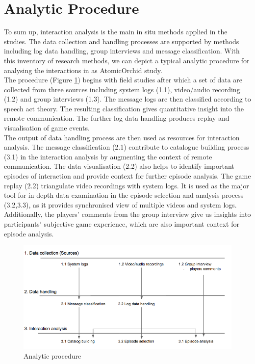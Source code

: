 \section{Analytic Procedure}
To sum up, interaction analysis is the main in situ methods applied in the studies. The data collection and handling processes are supported by methods including log data handling, group interviews and message classification. With this inventory of research methods, we can depict a typical analytic procedure for analysing the interactions in as AtomicOrchid study. \\

The procedure (Figure \ref{fig:analyticprocedure}) begins with field studies after which a set of data are collected from three sources including system logs (1.1), video/audio recording (1.2) and group interviews (1.3). The message logs are then classified according to speech act theory. The resulting classification gives quantitative insight into the remote communication. The further log data handling produces replay and visualisation of game events. \\

The output of data handling process are then used as resources for interaction analysis. The message classification (2.1) contribute to catalogue building process (3.1) in the interaction analysis by augmenting the context of remote communication. The data visualisation (2.2) also helps to identify important episodes of interaction and provide context for further episode analysis. The game replay (2.2) triangulate video recordings with system logs. It is used as the major tool for in-depth data examination in the episode selection and analysis process (3.2,3.3), as it provides synchronised view of multiple videos and system logs. Additionally, the players' comments from the group interview give us insights into participants' subjective game experience, which are also important context for episode analysis.\\



\begin{figure}[h]
  \centering
  \includegraphics[width=1\textwidth]{img/methodology/analyticprocedure}
  \caption{Analytic procedure}
  \label{fig:analyticprocedure}
\end{figure}

